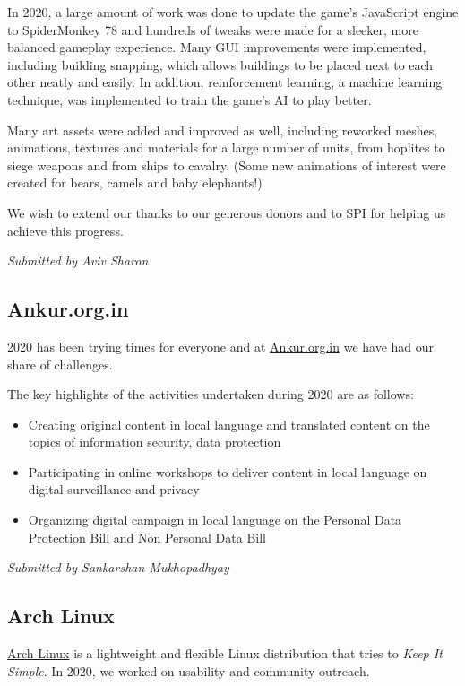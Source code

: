 \documentclass[a4paper]{report}
\begin{document}
In 2020, a large amount of work was done to update the game's JavaScript engine to SpiderMonkey 78 and hundreds of tweaks were made for a sleeker, more balanced gameplay experience. Many GUI improvements were implemented, including building snapping, which allows buildings to be placed next to each other neatly and easily. In addition, reinforcement learning, a machine learning technique, was implemented to train the game's AI to play better.

Many art assets were added and improved as well, including reworked meshes, animations, textures and materials for a large number of units, from hoplites to siege weapons and from ships to cavalry. (Some new animations of interest were created for bears, camels and baby elephants!)

We wish to extend our thanks to our generous donors and to SPI for helping us achieve this progress.

{\em Submitted by Aviv Sharon}

\subsection{Ankur.org.in}

2020 has been trying times for everyone and at \href{http://ankur.org.in/}{Ankur.org.in} we have had our share of challenges.

The key highlights of the activities undertaken during 2020 are as follows:

\begin{itemize}

\item Creating original content in local language and translated content on the topics of information security, data protection
\item Participating in online workshops to deliver content in local language on digital surveillance and privacy
\item Organizing digital campaign in local language on the Personal Data Protection Bill and Non Personal Data Bill

\end{itemize}

{\em Submitted by Sankarshan Mukhopadhyay}

\subsection{Arch Linux}

\href{https://archlinux.org/}{Arch Linux} is a lightweight and flexible Linux distribution that tries to \textit{Keep It Simple}.  In 2020, we worked on usability and community outreach.
\end{document}
